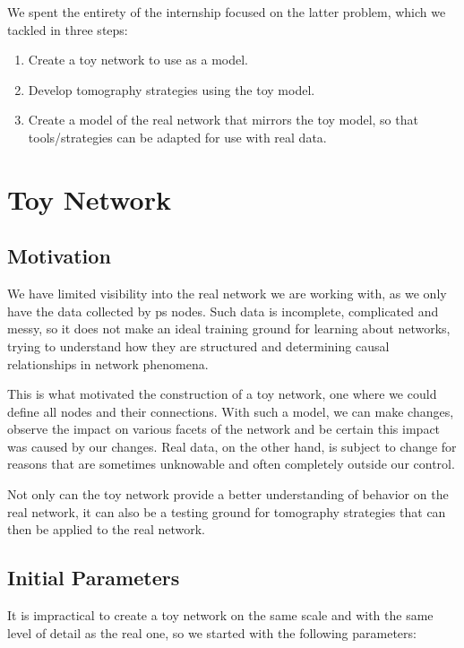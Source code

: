 \documentclass{finalreport}
\begin{document}
\noindent We spent the entirety of the internship focused on the latter problem, which we tackled in three steps:

\begin{enumerate}
	\item Create a toy network to use as a model.
	\item Develop \gls{tomography} strategies using the toy model.
	\item Create a model of the real network that mirrors the toy model, so that tools/strategies can be adapted for use with real data.
\end{enumerate}

\section{Toy Network}

\subsection{Motivation}

We have limited visibility into the real network we are working with, as we only have the data collected by \gls{ps} nodes. Such data is incomplete, complicated and messy, so it does not make an ideal training ground for learning about networks, trying to understand how they are structured and determining causal relationships in network phenomena.

This is what motivated the construction of a toy network, one where we could define all nodes and their connections. With such a model, we can make changes, observe the impact on various facets of the network and be certain this impact was caused by our changes. Real data, on the other hand, is subject to change for reasons that are sometimes unknowable and often completely outside our control.

Not only can the toy network provide a better understanding of behavior on the real network, it can also be a testing ground for \gls{tomography} strategies that can then be applied to the real network.


\subsection{Initial Parameters}

It is impractical to create a toy network on the same scale and with the same level of detail as the real one, so we started with the following parameters:
\end{document}
